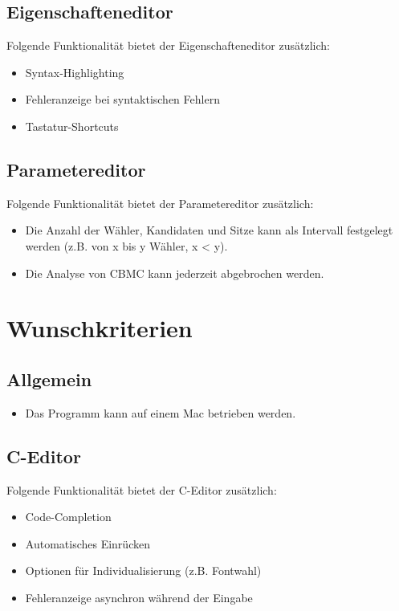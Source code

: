 \documentclass[a4paper]{scrreprt}
\begin{document}
\subsection{Eigenschafteneditor}
Folgende Funktionalität bietet der Eigenschafteneditor zusätzlich:
\begin{itemize}
	\item Syntax-Highlighting
	\item Fehleranzeige bei syntaktischen Fehlern
	\item Tastatur-Shortcuts
\end{itemize}

\subsection{Parametereditor}
Folgende Funktionalität bietet der Parametereditor zusätzlich:
\begin{itemize}
	\item Die Anzahl der Wähler, Kandidaten und Sitze kann als Intervall festgelegt werden (z.B. von x bis y Wähler, x < y).
	\item Die Analyse von \ac{CBMC} kann jederzeit abgebrochen werden.
\end{itemize}



\section{Wunschkriterien}
\subsection{Allgemein}
\begin{itemize}
\item Das Programm kann auf einem Mac betrieben werden.
\end{itemize}

\subsection{C-Editor}
Folgende Funktionalität bietet der C-Editor zusätzlich:
\begin{itemize}
	\item Code-Completion
	\item Automatisches Einrücken
	\item Optionen für Individualisierung (z.B. Fontwahl)
	\item Fehleranzeige asynchron während der Eingabe
\end{itemize}
\end{document}
